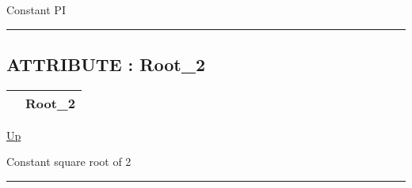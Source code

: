 \par
Constant PI


\rule{\textwidth}{0.4pt}
\subsection*{ATTRIBUTE : Root\_2}
\hypertarget{ecldoc:ml_core.constants.root_2}{}

{\renewcommand{\arraystretch}{1.5}
\begin{tabularx}{\textwidth}{|>{\raggedright\arraybackslash}l|X|}
\hline
\hspace{0pt} & Root\_2 \\
\hline
\end{tabularx}
}

\hyperlink{ecldoc:ML_Core.Constants}{Up}

\par
Constant square root of 2


\rule{\textwidth}{0.4pt}


